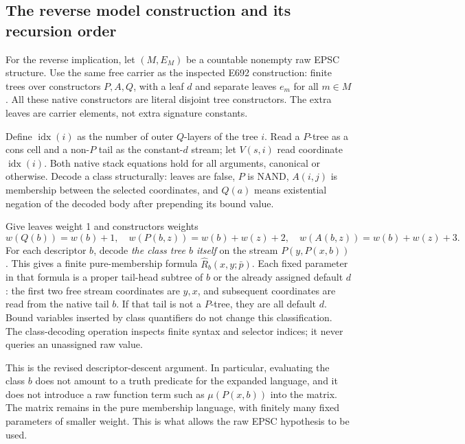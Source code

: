 \subsection{The reverse model construction and its recursion order}

For the reverse implication, let \((M,E_M)\) be a countable nonempty
raw EPSC structure.  Use the same free carrier as the inspected E692
construction: finite trees over constructors \(P,A,Q\), with a leaf
\(d\) and separate leaves \(e_m\) for all \(m\in M\).  All these
native constructors are literal disjoint tree constructors.  The extra
leaves are carrier elements, not extra signature constants.

Define \(\operatorname{idx}(i)\) as the number of outer \(Q\)-layers
of the tree \(i\).  Read a \(P\)-tree as a cons cell and a non-\(P\)
tail as the constant-\(d\) stream; let \(V(s,i)\) read coordinate
\(\operatorname{idx}(i)\).  Both native stack equations hold for all
arguments, canonical or otherwise.  Decode a class structurally: leaves
are false, \(P\) is NAND, \(A(i,j)\) is membership between the selected
coordinates, and \(Q(a)\) means existential negation of the decoded
body after prepending its bound value.

Give leaves weight 1 and constructors weights
\[
 w(Q(b))=w(b)+1,\quad
 w(P(b,z))=w(b)+w(z)+2,\quad
 w(A(b,z))=w(b)+w(z)+3.
\]
For each descriptor \(b\), decode \emph{the class tree \(b\) itself}
on the stream \(P(y,P(x,b))\).  This gives a finite pure-membership
formula \(\widehat R_b(x,y;\bar p)\).  Each fixed parameter in that
formula is a proper tail-head subtree of \(b\) or the already assigned
default \(d\): the first two free stream coordinates are \(y,x\),
and subsequent coordinates are read from the native tail \(b\).
If that tail is not a \(P\)-tree, they are all default \(d\).
Bound variables inserted by class quantifiers do not change this
classification.  The class-decoding operation inspects finite syntax and
selector indices; it never queries an unassigned raw value.

This is the revised descriptor-descent argument.  In particular, evaluating
the class \(b\) does not amount to a truth predicate for the expanded
language, and it does not introduce a raw function term such as
\(\mu(P(x,b))\) into the matrix.  The matrix remains in the pure
membership language, with finitely many fixed parameters of smaller
weight.  This is what allows the raw EPSC hypothesis to be used.

